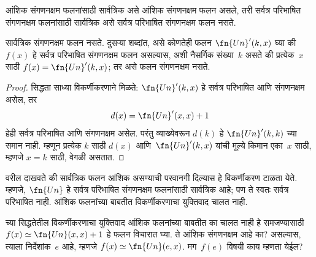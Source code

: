 \documentclass[../../../include/open-logic-section]{subfiles}
\begin{document}

आंशिक संगणनक्षम फलनांसाठी सार्वत्रिक असे आंशिक संगणनक्षम फलन असले,
तरी सर्वत्र परिभाषित संगणनक्षम फलनांसाठी सार्वत्रिक असे सर्वत्र
परिभाषित संगणनक्षम फलन नसते.

\begin{thm}
सार्वत्रिक संगणनक्षम फलन नसते. दुसऱ्या शब्दांत, असे कोणतेही
फलन $\fn{Un}'(k, x)$ घ्या की $f(x)$ हे सर्वत्र परिभाषित संगणनक्षम
फलन असल्यास, अशी नैसर्गिक संख्या~$k$ असते की प्रत्येक~$x$ साठी
$f(x) = \fn{Un}'(k,x)$; तर असे फलन संगणनक्षम नसते.
\end{thm}

\begin{proof}
सिद्धता साध्या विकर्णीकरणाने मिळते: $\fn{Un}'(k,x)$ हे सर्वत्र
परिभाषित आणि संगणनक्षम असेल, तर
\[
d(x) = \fn{Un}'(x, x) + 1
\]
हेही सर्वत्र परिभाषित आणि संगणनक्षम असेल. परंतु व्याख्येवरून
$d(k)$ हे $\fn{Un}'(k,k)$ च्या समान नाही. म्हणून प्रत्येक $k$
साठी $d(x)$ आणि~$\fn{Un}'(k, x)$ यांची मूल्ये किमान एका~$x$
साठी, म्हणजे $x = k$ साठी, वेगळी असतात.
\end{proof}

\begin{explain}
वरील  दाखवते की सार्वत्रिक फलन आंशिक
असण्याची परवानगी दिल्यास हे विकर्णीकरण टाळता येते. म्हणजे,
$\fn{Un}$ हे सर्वत्र परिभाषित संगणनक्षम फलनांसाठी सार्वत्रिक आहे;
पण ते स्वतः सर्वत्र परिभाषित नाही. आंशिक फलनांच्या बाबतीत
विकर्णीकरणाचा युक्तिवाद चालत नाही.
\end{explain}

\begin{prob}
   च्या सिद्धतेतील विकर्णीकरणाचा युक्तिवाद आंशिक
  फलनांच्या बाबतीत का चालत नाही हे समजण्यासाठी
  $f(x) \simeq \fn{Un}(x,x)+1$ हे फलन विचारात घ्या. ते आंशिक
  संगणनक्षम आहे का? असल्यास, त्याला निर्देशांक~$e$ आहे, म्हणजे
  $f(x) \simeq \fn{Un}(e,x)$. मग~$f(e)$ विषयी काय म्हणता येईल?
\end{prob}
\end{document}
